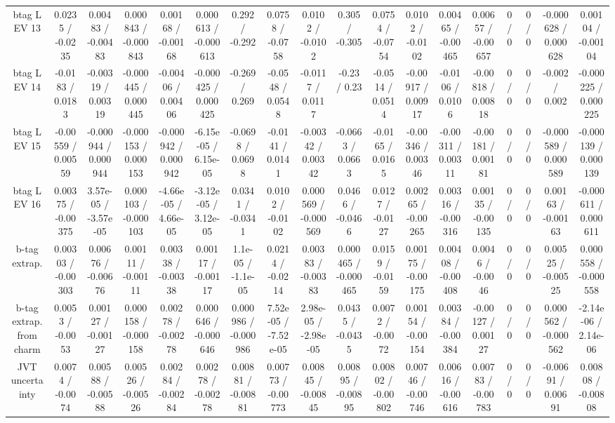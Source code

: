 \documentclass[10pt]{article}
\begin{document}
\begin{table}[htbp]
\begin{center}
\begin{tabular}{|c|c|c|c|c|c|c|c|c|c|c|c|c|c|c|c|c|c|}
  btag L EV 13 & 0.0235 / -0.0235 & 0.00483 / -0.00483 & 0.000843 / -0.000843 & 0.00168 / -0.00168 & 0.000613 / -0.000613 & 0.292 / -0.292 & 0.0758 / -0.0758 & 0.0102 / -0.0102 & 0.305 / -0.305 & 0.0754 / -0.0754 & 0.0102 / -0.0102 & 0.00465 / -0.00465 & 0.00657 / -0.00657 & 0 / 0 & 0 / 0 & -0.000628 / 0.000628 & 0.00104 / -0.00104 \\ 
  btag L EV 14 & -0.0183 / 0.0183 & -0.00319 / 0.00319 & -0.000445 / 0.000445 & -0.00406 / 0.00406 & -0.000425 / 0.000425 & -0.269 / 0.269 & -0.0548 / 0.0548 & -0.0117 / 0.0117 & -0.23 / 0.23 & -0.0514 / 0.0514 & -0.00917 / 0.00917 & -0.0106 / 0.0106 & -0.00818 / 0.00818 & 0 / 0 & 0 / 0 & -0.002 / 0.002 & -0.000225 / 0.000225 \\ 
  btag L EV 15 & -0.00559 / 0.00559 & -0.000944 / 0.000944 & -0.000153 / 0.000153 & -0.000942 / 0.000942 & -6.15e-05 / 6.15e-05 & -0.0698 / 0.0698 & -0.0141 / 0.0141 & -0.00342 / 0.00342 & -0.0663 / 0.0663 & -0.0165 / 0.0165 & -0.00346 / 0.00346 & -0.00311 / 0.00311 & -0.00181 / 0.00181 & 0 / 0 & 0 / 0 & -0.000589 / 0.000589 & -0.000139 / 0.000139 \\ 
  btag L EV 16 & 0.00375 / -0.00375 & 3.57e-05 / -3.57e-05 & 0.000103 / -0.000103 & -4.66e-05 / 4.66e-05 & -3.12e-05 / 3.12e-05 & 0.0341 / -0.0341 & 0.0102 / -0.0102 & 0.000569 / -0.000569 & 0.0466 / -0.0466 & 0.0127 / -0.0127 & 0.00265 / -0.00265 & 0.00316 / -0.00316 & 0.00135 / -0.00135 & 0 / 0 & 0 / 0 & 0.00163 / -0.00163 & -0.000611 / 0.000611 \\ 
  b-tag extrap. & 0.00303 / -0.00303 & 0.00676 / -0.00676 & 0.00111 / -0.00111 & 0.00338 / -0.00338 & 0.00117 / -0.00117 & 1.1e-05 / -1.1e-05 & 0.0214 / -0.0214 & 0.00383 / -0.00383 & 0.000465 / -0.000465 & 0.0159 / -0.0159 & 0.00175 / -0.00175 & 0.00408 / -0.00408 & 0.0046 / -0.0046 & 0 / 0 & 0 / 0 & 0.00525 / -0.00525 & 0.000558 / -0.000558 \\ 
  b-tag extrap. from charm & 0.0053 / -0.0053 & 0.00127 / -0.00127 & 0.000158 / -0.000158 & 0.00278 / -0.00278 & 0.000646 / -0.000646 & 0.000986 / -0.000986 & 7.52e-05 / -7.52e-05 & 2.98e-05 / -2.98e-05 & 0.0435 / -0.0435 & 0.0072 / -0.0072 & 0.00154 / -0.00154 & 0.00384 / -0.00384 & -0.00127 / 0.00127 & 0 / 0 & 0 / 0 & 0.000562 / -0.000562 & -2.14e-06 / 2.14e-06 \\ 
  JVT uncertainty & 0.0074 / -0.0074 & 0.00588 / -0.00588 & 0.00526 / -0.00526 & 0.00284 / -0.00284 & 0.00278 / -0.00278 & 0.00881 / -0.00881 & 0.00773 / -0.00773 & 0.00845 / -0.00845 & 0.00895 / -0.00895 & 0.00802 / -0.00802 & 0.00746 / -0.00746 & 0.00616 / -0.00616 & 0.00783 / -0.00783 & 0 / 0 & 0 / 0 & -0.00691 / 0.00691 & 0.00808 / -0.00808 \\ 

\end{tabular}
\end{center}
\end{table}
\end{document}
